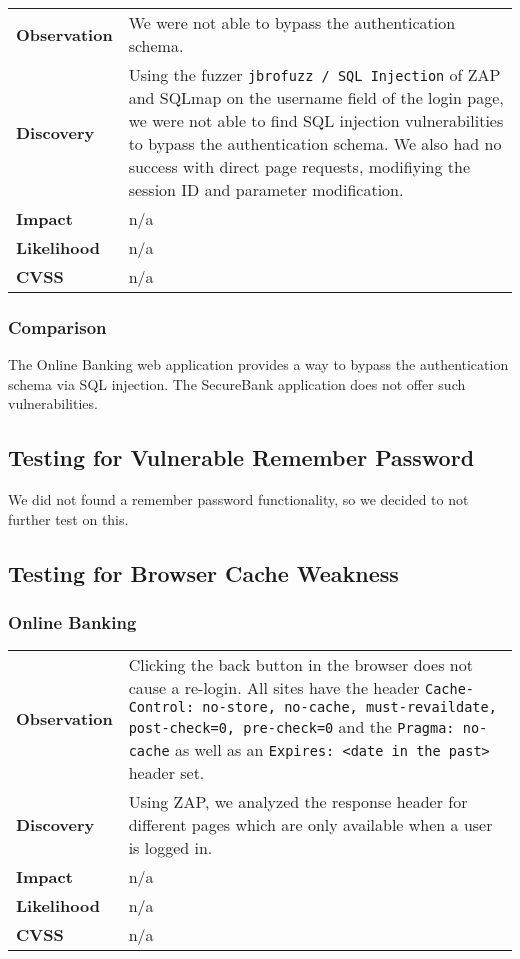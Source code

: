 \begin{tabular}{l|p{10cm}}

\textbf{Observation} & We were not able to bypass the authentication schema. \\
\textbf{Discovery} & Using the fuzzer \texttt{jbrofuzz / SQL Injection} of ZAP and SQLmap on the username field of the login page, we were not able to find SQL injection vulnerabilities to bypass the authentication schema. We also had no success with direct page requests, modifiying the session ID and parameter modification.   \\
\textbf{Impact} & n/a \\
\textbf{Likelihood} & n/a \\
\textbf{CVSS} & n/a \\
\end{tabular}

\subsubsection*{Comparison}
The Online Banking web application provides a way to bypass the authentication schema via SQL injection. The SecureBank application does not offer such vulnerabilities.

\clearpage

\subsection{Testing for Vulnerable Remember Password}
We did not found a remember password functionality, so we decided to not further test on this.

\clearpage

\subsection{Testing for Browser Cache Weakness}

\subsubsection*{Online Banking}

\begin{tabular}{l|p{10cm}}

\textbf{Observation} & Clicking the back button in the browser does not cause a re-login. All sites have the header \texttt{Cache-Control: no-store, no-cache, must-revaildate, post-check=0, pre-check=0} and the \texttt{Pragma: no-cache} as well as an \texttt{Expires: <date in the past>} header set. \\
\textbf{Discovery} & Using ZAP, we analyzed the response header for different pages which are only available when a user is logged in.\\
\textbf{Impact} & n/a \\
\textbf{Likelihood} & n/a \\
\textbf{CVSS} & n/a \\
\end{tabular}

